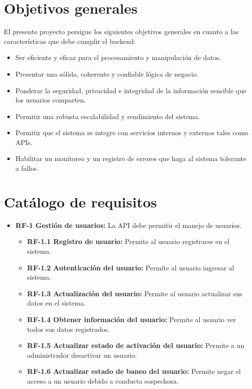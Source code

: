 \section{Objetivos generales}

El presente proyecto persigue los siguientes objetivos generales en cuanto a las características que debe cumplir el backend: 

\begin{itemize}
    \item Ser eficiente y eficaz para el procesamiento y manipulación de datos.
    \item Presentar una sólida, coherente y confiable lógica de negocio. 
    \item Ponderar la seguridad, privacidad e integridad de la información sensible que los usuarios comparten.
    \item Permitir una robusta escalabilidad y rendimiento del sistema.
    \item Permitir que el sistema se integre con servicios internos y externos tales como APIs.
    \item Habilitar un monitoreo y un registro de errores que haga al sistema tolerante a fallos. 
\end{itemize}

\section{Catálogo de requisitos}

\begin{itemize}
\tightlist
\item
  \textbf{RF-1 Gestión de usuarios:} La API debe permitir el manejo de usuarios.\\
  \begin{itemize}
  \tightlist
  \item
    \textbf{RF-1.1 Registro de usuario:} Permite al usuario registrarse en el sistema.\\
  \item
    \textbf{RF-1.2 Autenticación del usuario:} Permite al usuario ingresar al sistema.\\
  \item
    \textbf{RF-1.3 Actualización del usuario:} Permite al usuario actualizar sus datos en el sistema.\\
  \item
    \textbf{RF-1.4 Obtener información del usuario:} Permite al usuario ver todos sus datos registrados.\\
  \item
    \textbf{RF-1.5 Actualizar estado de activación del usuario:} Permite a un administrador desactivar un usuario.\\
  \item
    \textbf{RF-1.6 Actualizar estado de baneo del usuario:} Permite negar el acceso a un usuario debido a conducta sospechosa.\\
\end{itemize}    
\end{itemize}

